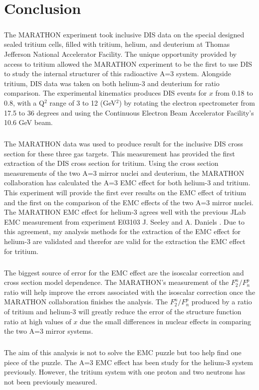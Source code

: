 
\chapter{Conclusion}
\paragraph{}The MARATHON experiment took inclusive DIS data on the special designed sealed tritium cells, filled with tritium, helium, and deuterium at Thomas Jefferson National Accelerator Facility. The unique opportunity provided by access to tritium allowed the MARATHON experiment to be the first to use DIS to study the internal structurer of this radioactive A=3 system. Alongside tritium, DIS data was taken on both helium-3 and deuterium for ratio comparison. The experimental kinematics produces DIS events for $x$ from 0.18 to 0.8, with a Q$^2$ range of 3 to 12 (GeV$^2$) by rotating the electron spectrometer from 17.5 to 36 degrees and using the Continuous Electron Beam Accelerator Facility's 10.6 GeV beam. 
\paragraph{}The MARATHON data was used to produce result for the inclusive DIS cross section for these three gas targets. This measurement has provided the first extraction of the DIS cross section for tritium. Using the cross section measurements of the two A=3 mirror nuclei and deuterium, the MARATHON collaboration has calculated the A=3 EMC effect for both helium-3 and tritium. This experiment will provide the first ever results on the EMC effect of tritium and the first on the comparison of the EMC effects of the two A=3 mirror nuclei. The MARATHON EMC effect for helium-3 agrees well with the previous JLab EMC measurement from experiment E03103 J. Seeley and A. Daniels \cite{seeley}. Due to this agreement, my analysis methods for the extraction of the EMC effect for helium-3 are validated and therefor are valid for the extraction the EMC effect for tritium.
\paragraph{}The biggest source of error for the EMC effect are the isoscalar correction and cross section model dependence. The MARATHON's measurement of the $F^n_2/F^p_n$ ratio will help improve the errors associated with the isoscalar correction once the MARATHON collaboration finishes the analysis. The $F^n_2/F^p_n$ produced by a ratio of tritium and helium-3 will greatly reduce the error of the structure function ratio at high values of $x$ due the small differences in nuclear effects in comparing the two A=3 mirror systems. 


\paragraph{}The aim of this analysis is not to solve the EMC puzzle but too help find one piece of the puzzle. The A=3 EMC effect has been study for the helium-3 system previously. However, the tritium system with one proton and two neutrons has not been previously measured.  
